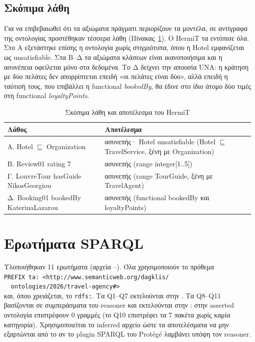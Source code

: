 \documentclass[conference]{IEEEtran}
\newcommand{\cls}[1]{\textsf{#1}}          %
\newcommand{\prop}[1]{\textit{#1}}         %
\begin{document}
\subsection{Σκόπιμα λάθη}
\label{sec:negative}

Για να επιβεβαιωθεί ότι τα αξιώματα πράγματι περιορίζουν τα μοντέλα, σε αντίγραφα
της οντολογίας προστέθηκαν τέσσερα λάθη (Πίνακας~\ref{tab:negative}). Ο HermiT τα
εντόπισε όλα. Στο Α εξετάστηκε επίσης η οντολογία χωρίς στιγμιότυπα, όπου η
\cls{Hotel} εμφανίζεται ως unsatisfiable. Στα Β--Δ τα αξιώματα κλάσεων είναι
ικανοποιήσιμα και η ασυνέπεια οφείλεται μόνο στα δεδομένα. Το Δ δείχνει την
απουσία UNA: η κράτηση με δύο πελάτες δεν απορρίπτεται επειδή «οι πελάτες είναι
δύο», αλλά επειδή η ταύτισή τους, που επιβάλλει η functional \prop{bookedBy}, θα
έδινε στο ίδιο άτομο δύο τιμές στη functional \prop{loyaltyPoints}.

\begin{table}[!t]
\caption{Σκόπιμα λάθη και αποτέλεσμα του HermiT}
\label{tab:negative}
\centering\scriptsize
\setlength{\tabcolsep}{3pt}
\begin{tabular}{@{}p{}p{}@{}}
\toprule
Λάθος & Αποτέλεσμα \\
\midrule
Α. Hotel $\sqsubseteq$ Organization & ασυνεπής· Hotel unsatisfiable (Hotel $\sqsubseteq$ TravelService, ξένη με Organization) \\
Β. Review01 rating 7 & ασυνεπής (range integer[1..5]) \\
Γ. LouvreTour hasGuide NikosGeorgiou & ασυνεπής (range TourGuide, ξένη με TravelAgent) \\
Δ. Booking01 bookedBy KaterinaLazarou & ασυνεπής (functional bookedBy και loyaltyPoints) \\
\bottomrule
\end{tabular}
\end{table}

\section{Ερωτήματα SPARQL}

Υλοποιήθηκαν 11 ερωτήματα (αρχεία --). Όλα
χρησιμοποιούν το πρόθεμα\\
\texttt{\footnotesize PREFIX ta: <http://www.semanticweb.org/dagklis/}\\
\texttt{\footnotesize \ \ ontologies/2026/travel-agency\#>}\\
και, όπου χρειάζεται, το \texttt{rdfs:}. Τα Q1--Q7 εκτελούνται στην
. Τα Q8--Q11 βασίζονται σε συμπεράσματα του reasoner και
εκτελούνται στην : στην asserted οντολογία
επιστρέφουν 0 γραμμές (το Q10 επιστρέφει τα 7 πακέτα χωρίς καμία κατηγορία).
Χρησιμοποιείται το inferred αρχείο ώστε τα αποτελέσματα να μην εξαρτώνται από
το αν το plugin SPARQL του Protégé λαμβάνει υπόψη τον reasoner.
\end{document}
